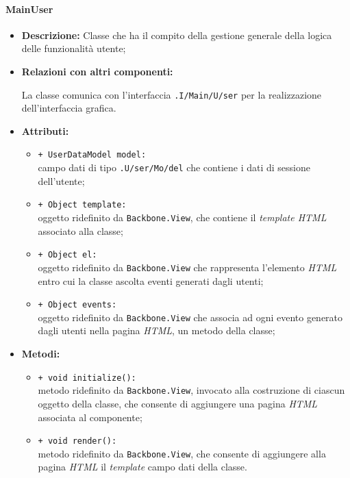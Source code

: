 \paragraph{MainUser}
\label{mainUser}
\begin{flushleft}
\begin{itemize}
\item \textbf{Descrizione:} Classe che ha il compito della gestione generale della logica delle funzionalità utente;
\item \textbf{Relazioni con altri componenti:}
\begin{sloppypar}
La classe comunica con l'interfaccia \texttt{\viewUser{}.I\fshyp{}Main\fshyp{}U\fshyp{}ser} per la realizzazione dell'interfaccia grafica.
\end{sloppypar}
\item \textbf{Attributi:}
\begin{sloppypar}
\begin{itemize}
\item \texttt{+ UserDataModel model:}\\ campo dati di tipo \texttt{\model{}.U\fshyp{}ser\fshyp{}Mo\fshyp{}del} che contiene i dati di sessione dell'utente;
\item \texttt{+ Object template:}\\ oggetto ridefinito da \texttt{Backbone.View}, che contiene il \textit{template HTML} associato alla classe;
\item \texttt{+ Object el:}\\ oggetto ridefinito da \texttt{Backbone.View} che rappresenta l'elemento \textit{HTML} entro cui la classe ascolta eventi generati dagli utenti;
\item \texttt{+ Object events:}\\ oggetto ridefinito da \texttt{Backbone.View} che associa ad ogni evento generato dagli utenti nella pagina \textit{HTML}, un metodo della classe;
\end{itemize}
\end{sloppypar}
\item \textbf{Metodi:}
\begin{sloppypar}
\begin{itemize}
\item \texttt{+ void initialize():}\\ metodo ridefinito da \texttt{Backbone.View}, invocato alla costruzione di ciascun oggetto della classe, che consente di aggiungere una pagina \textit{HTML} associata al componente;
\item \texttt{+ void render():}\\ metodo ridefinito da \texttt{Backbone.View}, che consente di aggiungere alla pagina \textit{HTML} il \textit{template} campo dati della classe.
\end{itemize}
\end{sloppypar}
\end{itemize}
\end{flushleft}


